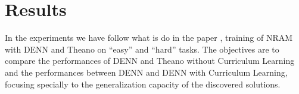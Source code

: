 \section{Results}
In the experiments we have follow what is do in the paper \cite{NRAM:2016}, training of NRAM with DENN and Theano on ``easy'' and ``hard'' tasks. The objectives are to compare the performances of DENN and Theano without Curriculum Learning and the performances between DENN and DENN with Curriculum Learning, focusing specially to the generalization capacity of the discovered solutions.\newline
\begin{table}[t]
	\centering

\end{table}
